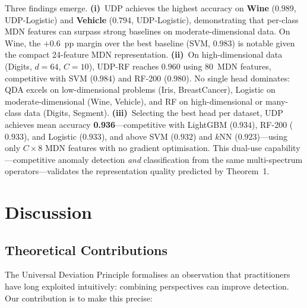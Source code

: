 \documentclass[journal]{IEEEtran}
\begin{document}
Three findings emerge.
\textbf{(i)}~UDP achieves the highest accuracy on \textbf{Wine} ($0.989$, UDP-Logistic) and \textbf{Vehicle} ($0.794$, UDP-Logistic), demonstrating that per-class MDN features can surpass strong baselines on moderate-dimensional data.  On Wine, the $+0.6$~pp margin over the best baseline (SVM, $0.983$) is notable given the compact 24-feature MDN representation.
\textbf{(ii)}~On high-dimensional data (Digits, $d{=}64$, $C{=}10$), UDP-RF reaches $0.960$ using 80~MDN features, competitive with SVM ($0.984$) and RF-200 ($0.980$).  No single head dominates: QDA excels on low-dimensional problems (Iris, BreastCancer), Logistic on moderate-dimensional (Wine, Vehicle), and RF on high-dimensional or many-class data (Digits, Segment).
\textbf{(iii)}~Selecting the best head per dataset, UDP achieves mean accuracy \textbf{0.936}---competitive with LightGBM ($0.934$), RF-200 ($0.933$), and Logistic ($0.933$), and above SVM ($0.932$) and $k$NN ($0.923$)---using only $C \times 8$ MDN features with no gradient optimisation.  This dual-use capability---competitive anomaly detection \emph{and} classification from the same multi-spectrum operators---validates the representation quality predicted by Theorem~1.

\section{Discussion}
\label{sec:discussion}

\subsection{Theoretical Contributions}

The Universal Deviation Principle formalises an observation that practitioners have long exploited intuitively: combining perspectives can improve detection. Our contribution is to make this precise:
\end{document}
